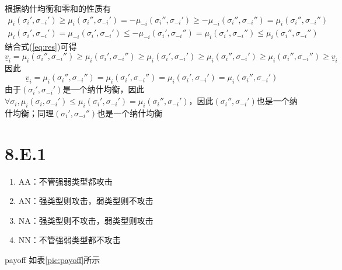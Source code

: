 \documentclass[a4paper,12pt]{ctexart}
\begin{document}
根据纳什均衡和零和的性质有
\begin{eqnarray}
    \mu_i(\sigma_i',\sigma_{-i}') \ge\mu_i(\sigma_i'',\sigma_{-i}') =-\mu_{-i}(\sigma_i'',\sigma_{-i}') \ge-\mu_{-i}(\sigma_i'',\sigma_{-i}'') = \mu_i(\sigma_i'',\sigma_{-i} '') \\
    \mu_i(\sigma_i',\sigma_{-i}') =\mu_{-i}(\sigma_i',\sigma_{-i}') \le-\mu_{-i}(\sigma_i',\sigma_{-i}'') =\mu_{i}(\sigma_i',\sigma_{-i}'') \le \mu_i(\sigma_i'',\sigma_{-i} '')
\end{eqnarray}
结合式(\ref{eq:res})可得
\begin{equation}
    \underline{v}_i=\mu_i(\sigma_i'',\sigma_{-i}'')\ge\mu_i(\sigma_i',\sigma_{-i}'')\ge\mu_i(\sigma_i',\sigma_{-i}')\ge\mu_i(\sigma_i'',\sigma_{-i}')\ge\mu_i(\sigma_i'',\sigma_{-i}'')\ge \underline{v}_i
\end{equation}
因此
\begin{equation}
    \underline{v}_i=\mu_i(\sigma_i'',\sigma_{-i}'')=\mu_i(\sigma_i',\sigma_{-i}'')=\mu_i(\sigma_i',\sigma_{-i}')=\mu_i(\sigma_i'',\sigma_{-i}')
\end{equation}
由于$(\sigma_i',\sigma_{-i}')$是一个纳什均衡，因此$\forall \sigma_i,\mu_i(\sigma_i,\sigma_{-i}')\le\mu_i(\sigma_i',\sigma_{-i}')=\mu_i(\sigma_i'',\sigma_{-i}')$，因此$(\sigma_i'',\sigma_{-i}')$也是一个纳什均衡；同理$(\sigma_i',\sigma_{-i}'')$也是一个纳什均衡
\section{8.E.1}
\begin{enumerate}
    \item AA：不管强弱类型都攻击
    \item AN：强类型则攻击，弱类型则不攻击
    \item NA：强类型则不攻击，弱类型则攻击
    \item NN：不管强弱类型都不攻击
\end{enumerate}
payoff 如表\ref{pic:payoff}所示
\end{document}

